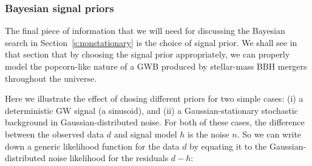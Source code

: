 \subsubsection{Bayesian signal priors}
\label{s:signal_priors}

The final piece of information that we will need 
for discussing the Bayesian search in 
Section~\ref{s:nonstationary} is the choice 
of signal prior.
We shall see in that section that by choosing the 
signal prior appropriately, we can properly model 
the popcorn-like nature of a GWB produced by
stellar-mass BBH mergers throughout the universe.

Here we illustrate the effect of chosing different
priors for two simple cases: 
(i) a deterministic GW signal (a sinusoid), and 
(ii) a Gaussian-stationary stochastic background in 
Gaussian-distributed noise.
For both of these cases, the difference between the 
observed data $d$ and signal model $h$ is the noise $n$.
So we can write down a generic likelihood function for 
the data $d$ by equating it to the 
Gaussian-distributed noise likelihood for the residuals $d-h$:
%
